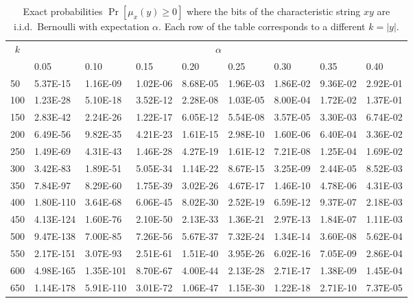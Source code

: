 \begin{table}[h]
	\centering
	\caption{
		Exact probabilities $\Pr[\mu_x(y) \geq 0]$ where 
		the bits of the characteristic string $xy$ are i.i.d.\ Bernoulli with expectation $\alpha$. 
		Each row of the table corresponds to a different $k = |y|$.
	} 
	\label{table:exact-probs}


	\begin{tabular}{|l||l|l|l|l|l|l|l|l|}
	\hline
	\multicolumn{1}{|c||}{\multirow{2}{*}{$k$}} & \multicolumn{8}{c|}{$\alpha$}                                             \\ \cline{2-9} 
	\multicolumn{1}{|c||}{}                   & 0.05     & 0.10      & 0.15     & 0.20      & 0.25     & 0.30      & 0.35     & 0.40      \\ 
	\hhline{|=#=|=|=|=|=|=|=|=|}
	50   & 5.37E-15  & 1.16E-09  & 1.02E-06  & 8.68E-05 & 1.96E-03 & 1.86E-02 & 9.36E-02 & 2.92E-01 \\ \hline
	100  & 1.23E-28  & 5.10E-18  & 3.52E-12  & 2.28E-08 & 1.03E-05 & 8.00E-04 & 1.72E-02 & 1.37E-01 \\ \hline
	150  & 2.83E-42  & 2.24E-26  & 1.22E-17  & 6.05E-12 & 5.54E-08 & 3.57E-05 & 3.30E-03 & 6.74E-02 \\ \hline
	200  & 6.49E-56  & 9.82E-35  & 4.21E-23  & 1.61E-15 & 2.98E-10 & 1.60E-06 & 6.40E-04 & 3.36E-02 \\ \hline
	250  & 1.49E-69  & 4.31E-43  & 1.46E-28  & 4.27E-19 & 1.61E-12 & 7.21E-08 & 1.25E-04 & 1.69E-02 \\ \hline
	300  & 3.42E-83  & 1.89E-51  & 5.05E-34  & 1.14E-22 & 8.67E-15 & 3.25E-09 & 2.44E-05 & 8.52E-03 \\ \hline
	350  & 7.84E-97  & 8.29E-60  & 1.75E-39  & 3.02E-26 & 4.67E-17 & 1.46E-10 & 4.78E-06 & 4.31E-03 \\ \hline
	400  & 1.80E-110 & 3.64E-68  & 6.06E-45  & 8.02E-30 & 2.52E-19 & 6.59E-12 & 9.37E-07 & 2.18E-03 \\ \hline
	450  & 4.13E-124 & 1.60E-76  & 2.10E-50  & 2.13E-33 & 1.36E-21 & 2.97E-13 & 1.84E-07 & 1.11E-03 \\ \hline
	500  & 9.47E-138 & 7.00E-85  & 7.26E-56  & 5.67E-37 & 7.32E-24 & 1.34E-14 & 3.60E-08 & 5.62E-04 \\ \hline
	550  & 2.17E-151 & 3.07E-93  & 2.51E-61  & 1.51E-40 & 3.95E-26 & 6.02E-16 & 7.05E-09 & 2.86E-04 \\ \hline
	600  & 4.98E-165 & 1.35E-101 & 8.70E-67  & 4.00E-44 & 2.13E-28 & 2.71E-17 & 1.38E-09 & 1.45E-04 \\ \hline
	650  & 1.14E-178 & 5.91E-110 & 3.01E-72  & 1.06E-47 & 1.15E-30 & 1.22E-18 & 2.71E-10 & 7.37E-05 \\ \hline

\end{tabular}
\end{table}

